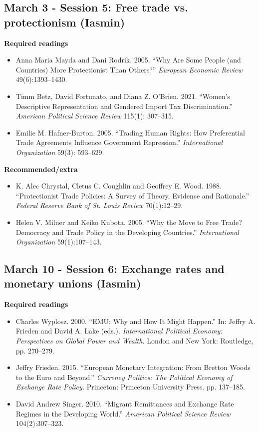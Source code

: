 \documentclass[12pt, a4paper]{article}
\begin{document}
\subsection*{March 3 - Session 5: Free trade vs. protectionism (Iasmin)}

\noindent \textbf{Required readings}

\begin{itemize}
\item Anna Maria Mayda and Dani Rodrik. 2005. ``Why Are Some People (and Countries) More Protectionist Than Others?'' \emph{European Economic Review} 49(6):1393--1430.
\item Timm Betz, David Fortunato, and Diana Z. O'Brien. 2021. ``Women's Descriptive Representation and Gendered Import Tax Discrimination.'' \emph{American Political Science Review} 115(1): 307--315.
\item Emilie M. Hafner-Burton. 2005. ``Trading Human Rights: How Preferential Trade Agreements Influence Government Repression.'' \emph{International Organization} 59(3): 593--629.
\end{itemize}

\noindent \textbf{Recommended/extra}

\begin{itemize}
\item K. Alec Chrystal, Cletus C. Coughlin and Geoffrey E. Wood. 1988. ``Protectionist Trade Policies: A Survey of Theory, Evidence and Rationale.'' \emph{Federal Reserve Bank of St. Louis Review} 70(1):12--29.
\item Helen V. Milner and Keiko Kubota. 2005. ``Why the Move to Free Trade? Democracy and Trade Policy in the Developing Countries.'' \emph{International Organization} 59(1):107--143.
\end{itemize}

\subsection*{March 10 - Session 6: Exchange rates and monetary unions (Iasmin)}

\noindent \textbf{Required readings}

\begin{itemize}
\item Charles Wyplosz. 2000. ``EMU: Why and How It Might Happen.'' In: Jeffry A. Frieden and David A. Lake (eds.). \emph{International Political Economy: Perspectives on Global Power and Wealth.} London and New York: Routledge, pp. 270--279.
\item Jeffry Frieden. 2015. ``European Monetary Integration: From Bretton Woods to the Euro and Beyond.'' \emph{Currency Politics: The Political Economy of Exchange Rate Policy.} Princeton: Princeton University Press. pp. 137--185.
\item David Andrew Singer. 2010. ``Migrant Remittances and Exchange Rate Regimes in the Developing World.'' \emph{American Political Science Review} 104(2):307--323.
\end{itemize}
\end{document}
